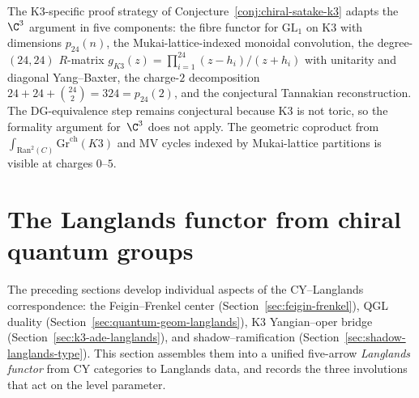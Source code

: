 The K3-specific proof strategy of Conjecture~\ref{conj:chiral-satake-k3}
adapts the $\C^3$ argument in five components: the fibre functor for
$\mathrm{GL}_1$ on K3 with dimensions $p_{24}(n)$, the
Mukai-lattice-indexed monoidal convolution, the degree-$(24,24)$
$R$-matrix
$g_{K3}(z)=\prod_{i=1}^{24}(z-h_i)/(z+h_i)$ with unitarity and diagonal
Yang--Baxter, the charge-$2$ decomposition
$24+24+\binom{24}{2}=324=p_{24}(2)$, and the conjectural Tannakian
reconstruction.  The DG-equivalence step remains conjectural because
K3 is not toric, so the formality argument for~$\C^3$ does not apply.
The geometric coproduct from
$\int_{\mathrm{Ran}^2(C)} \mathrm{Gr}^{\mathrm{ch}}(K3)$ and MV cycles
indexed by Mukai-lattice partitions is visible at charges $0$--$5$.


\section{The Langlands functor from chiral quantum groups}
\label{sec:langlands-functor-chiral-qg}

The preceding sections develop individual aspects of the CY--Langlands correspondence: the Feigin--Frenkel center (Section~\ref{sec:feigin-frenkel}), QGL duality (Section~\ref{sec:quantum-geom-langlands}), K3 Yangian--oper bridge (Section~\ref{sec:k3-ade-langlands}), and shadow--ramification (Section~\ref{sec:shadow-langlands-type}). This section assembles them into a unified five-arrow \emph{Langlands functor} from CY categories to Langlands data, and records the three involutions that act on the level parameter.

